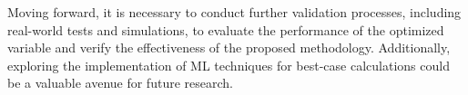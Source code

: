Moving forward, it is necessary to conduct further validation processes, including real-world tests and simulations, to evaluate the performance of the optimized variable and verify the effectiveness of the proposed methodology. Additionally, exploring the implementation of \acrshort{ML} techniques for best-case calculations could be a valuable avenue for future research.


